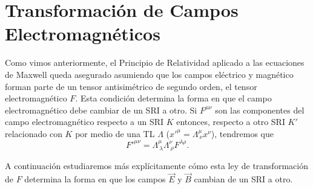 \section{Transformación de Campos Electromagnéticos}
Como vimos anteriormente, el Principio de Relatividad aplicado a las ecuaciones de Maxwell queda asegurado asumiendo que los campos eléctrico y magnético forman parte de un tensor antisimétrico de segundo orden, el tensor electromagnético $F$. Esta condición determina la forma en
que el campo electromagnético debe cambiar de un SRI a otro. Si $F^{\mu\nu}$
son las componentes del campo electromagnético respecto a un SRI $K$ entonces,
respecto a otro SRI $K'$ relacionado con $K$ por medio de una TL $\Lambda$
($x'^\mu=\Lambda^\mu_{\  \nu}x^\nu$), tendremos que
\begin{equation}
F'^{\mu\nu}=\Lambda^\mu_{\ \lambda}\Lambda^\nu_{\ \rho}F^{\lambda\rho}.
\label{FLLF}
\end{equation}

A continuación estudiaremos más explícitamente cómo esta ley de transformación de $F$ determina
la forma en que los campos $\vec{E}$ y $\vec{B}$ cambian de un SRI a otro.

